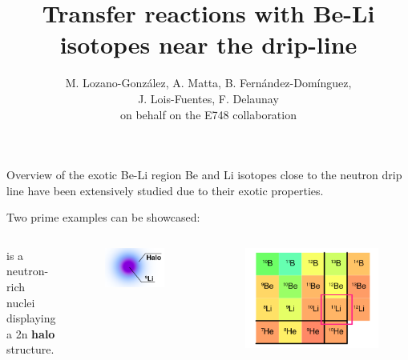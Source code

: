 \documentclass[sans,
frameno, %
mp,
usenames,dvipsnames, %
onlytextwidth, %
t,%
11pt]{beamer}
\title{Transfer reactions with Be-Li isotopes near the drip-line}
\date{\empty}
\author{M. Lozano-González, A. Matta, B. Fernández-Domínguez, 
\texorpdfstring{\\}{} J. Lois-Fuentes, F. Delaunay \texorpdfstring{\\}{}
{\small on behalf on the E748 collaboration}}
\institute{IGFAE\textminus USC and LPC\textminus Caen}
\newcommand{\notice}[1]{\textbf{\alert{#1}}}
\newcommand{\iso}[2]{\ce{^{#1}#2}}
\begin{document}
\frame[plain]{\titlepage}

{}
\begin{frame}[t]{Overview of the exotic Be-Li region}
    Be and Li isotopes close to the neutron drip line have been extensively studied due to their exotic properties.

    Two prime examples can be showcased:

    \medskip
    \begin{columns}[c]
        \only<+>
        {
            {
                \noindent\notice{\iso{11}{Li}} is a neutron-rich nuclei displaying a 2n \textbf{halo} structure.

                \bigskip

                \bigskip
                \begin{figure}
                    \centering
                    \includegraphics[width=0.7\linewidth]{figures/11Li.png}
                \end{figure}
            }
            \hfill
            {
                \begin{figure}
                    \centering
                    \includegraphics[width=0.9\linewidth]{figures/chart_new_11Li.png}

\end{figure}}}
\end{columns}
\end{frame}
\end{document}
